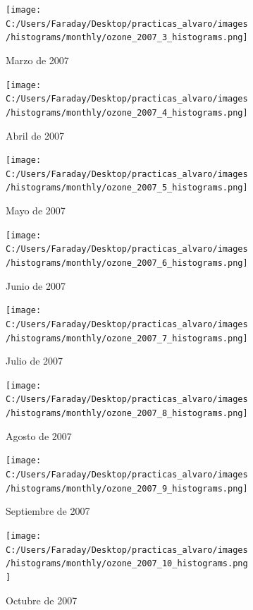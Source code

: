 \documentclass[12pt]{article}
\begin{document}
\begin{figure}[H]
\centering
\begin{subfigure}[h]{0.45\textwidth}
\texttt{[image: C:/Users/Faraday/Desktop/practicas\_alvaro/images/histograms/monthly/ozone\_2007\_3\_histograms.png]}
\caption{Marzo de 2007}
\label{fig:hist-mon-2-3-2007}
\end{subfigure}
%
\begin{subfigure}[H]{0.45\textwidth}
\texttt{[image: C:/Users/Faraday/Desktop/practicas\_alvaro/images/histograms/monthly/ozone\_2007\_4\_histograms.png]}
\caption{Abril de 2007}
\label{fig:hist-mon-2-4-2007}
\end{subfigure}
\caption{}
\end{figure}

\begin{figure}[H]
\centering
\begin{subfigure}[h]{0.45\textwidth}
\texttt{[image: C:/Users/Faraday/Desktop/practicas\_alvaro/images/histograms/monthly/ozone\_2007\_5\_histograms.png]}
\caption{Mayo de 2007}
\label{fig:hist-mon-2-5-2007}
\end{subfigure}
%
\begin{subfigure}[H]{0.45\textwidth}
\texttt{[image: C:/Users/Faraday/Desktop/practicas\_alvaro/images/histograms/monthly/ozone\_2007\_6\_histograms.png]}
\caption{Junio de 2007}
\label{fig:hist-mon-2-6-2007}
\end{subfigure}
\caption{}
\end{figure}

\newpage

\begin{figure}[H]
\centering
\begin{subfigure}[h]{0.45\textwidth}
\texttt{[image: C:/Users/Faraday/Desktop/practicas\_alvaro/images/histograms/monthly/ozone\_2007\_7\_histograms.png]}
\caption{Julio de 2007}
\label{fig:hist-mon-2-7-2007}
\end{subfigure}
%
\begin{subfigure}[H]{0.45\textwidth}
\texttt{[image: C:/Users/Faraday/Desktop/practicas\_alvaro/images/histograms/monthly/ozone\_2007\_8\_histograms.png]}
\caption{Agosto de 2007}
\label{fig:hist-mon-2-8-2007}
\end{subfigure}
\caption{}
\end{figure}

\begin{figure}[H]
\centering
\begin{subfigure}[h]{0.45\textwidth}
\texttt{[image: C:/Users/Faraday/Desktop/practicas\_alvaro/images/histograms/monthly/ozone\_2007\_9\_histograms.png]}
\caption{Septiembre de 2007}
\label{fig:hist-mon-2-9-2007}
\end{subfigure}
%
\begin{subfigure}[H]{0.45\textwidth}
\texttt{[image: C:/Users/Faraday/Desktop/practicas\_alvaro/images/histograms/monthly/ozone\_2007\_10\_histograms.png]}
\caption{Octubre de 2007}
\label{fig:hist-mon-2-10-2007}
\end{subfigure}
\caption{}
\end{figure}
\end{document}
